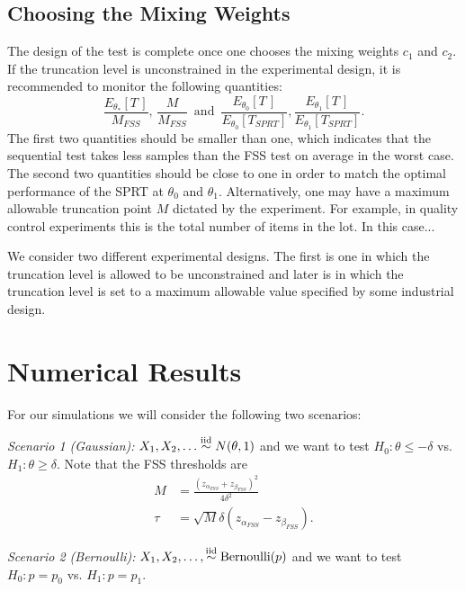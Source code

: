 \documentclass[11pt]{article}
\begin{document}
\subsection{Choosing the Mixing Weights}\label{sec:mixing_weights}

The design of the test is complete once one chooses the mixing weights $c_1$ and $c_2$. If the truncation level is unconstrained in the experimental design, it is recommended to monitor the following quantities:
\begin{equation}\label{eq:c_optim}
\frac{E_{\theta_{*}}[T\,]}{M_{FSS}}, \, \frac{M}{M_{FSS}}  \, \text{ and } \, \frac{E_{\theta_0}[T\,]}{E_{\theta_0}[T_{SPRT}]}, \frac{E_{\theta_1}[T\,]}{E_{\theta_1}[T_{SPRT}]}.
\end{equation}
The first two quantities should be smaller than one, which indicates that the sequential test takes less samples than the FSS test on average in the worst case. The second two quantities should be close to one in order to match the optimal performance of the SPRT at $\theta_0$ and $\theta_1$. Alternatively, one may have a maximum allowable truncation point $M$ dictated by the experiment. For example, in quality control experiments this is the total number of items in the lot. In this case...

We consider two different experimental designs. The first is one in which the truncation level is allowed to be unconstrained and later is in which the truncation level is set to a maximum allowable value specified by some industrial design.

\section{Numerical Results}

For our simulations we will consider the following two scenarios:

\textit{Scenario 1 (Gaussian):} $X_1, X_2, \dots \overset{\text{iid}}\sim N(\theta, 1)$ and we want to test $H_0 : \theta \leq -\delta$ vs. $H_1 : \theta \geq \delta$. Note that the FSS thresholds are
\begin{equation}
\begin{split}
M &= \frac{(z_{\alpha_{FSS}} + z_{\beta_{FSS}})^2}{4 \delta^2} \\
\tau &= \sqrt{M} \delta (z_{\alpha_{FSS}} - z_{\beta_{FSS}}).
\end{split}
\end{equation}

\textit{Scenario 2 (Bernoulli):} $X_1, X_2, \dots, \overset{\text{iid}}\sim \text{Bernoulli}(p)$ and we want to test $H_0: p = p_0$ vs. $H_1: p = p_1$.
\end{document}
